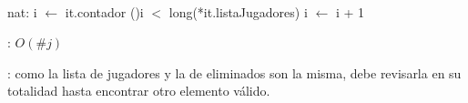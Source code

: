 \begin{Algoritmos}
	~

	\begin{algorithm}[H]
		\NoCaptionOfAlgo
		\caption{}
		nat: i $\leftarrow$ it.contador
		\While(){i $<$ long(*it.listaJugadores)}{
			i $\leftarrow$ i + 1
		}
	\end{algorithm}

	\complejidad: $O(\#j)$

	\justifcomp: como la lista de jugadores y la de eliminados son la misma, debe revisarla en su totalidad hasta encontrar otro elemento válido.


\end{Algoritmos}
